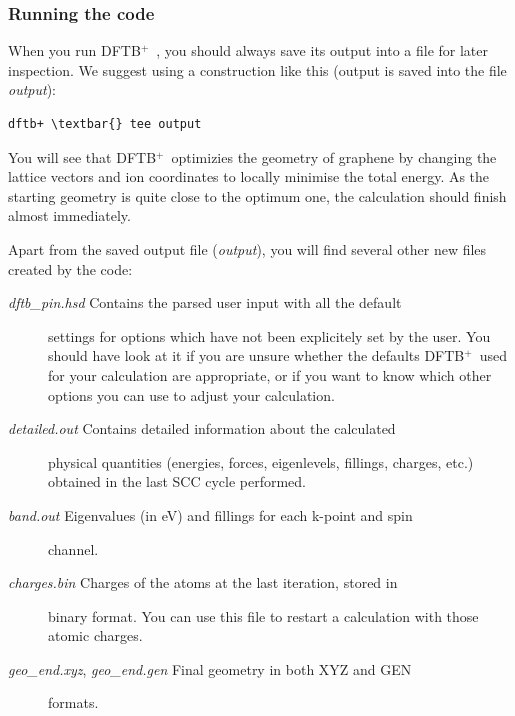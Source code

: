 \documentclass[a4paper,11pt,english]{sphinxmanual}
\newcommand{\dftbp}{\textsf{DFTB$^{\text{+}}$\ }} %
\begin{document}
{{\begin{itemize}
\end{itemize}


\subsubsection{Running the code}
\label{electstruct:running-the-code}
When you run \dftbp, you should always save its output into a file for
later inspection. We suggest using a construction like this (output is
saved into the file \emph{output}):

\begin{Verbatim}[commandchars=\\\{\}]
dftb+ \textbar{} tee output
\end{Verbatim}

You will see that \dftbp optimizies the geometry of graphene by
changing the lattice vectors and ion coordinates to locally minimise
the total energy. As the starting geometry is quite close to the
optimum one, the calculation should finish almost immediately.

Apart from the saved output file (\emph{output}), you will find several
other new files created by the code:
\begin{description}
\item[{\emph{dftb\_pin.hsd} Contains the parsed user input with all the default}] \leavevmode
settings for options which have not been explicitely set by the
user. You should have look at it if you are unsure whether the
defaults \dftbp used for your calculation are appropriate, or if you
want to know which other options you can use to adjust your
calculation.

\item[{\emph{detailed.out} Contains detailed information about the calculated}] \leavevmode
physical quantities (energies, forces, eigenlevels, fillings,
charges, etc.)  obtained in the last SCC cycle performed.

\item[{\emph{band.out} Eigenvalues (in eV) and fillings for each k-point and spin}] \leavevmode
channel.

\item[{\emph{charges.bin} Charges of the atoms at the last iteration, stored in}] \leavevmode
binary format. You can use this file to restart a calculation with
those atomic charges.

\item[{\emph{geo\_end.xyz}, \emph{geo\_end.gen} Final geometry in both XYZ and GEN}] \leavevmode
formats.


\end{description}}}
\end{document}
